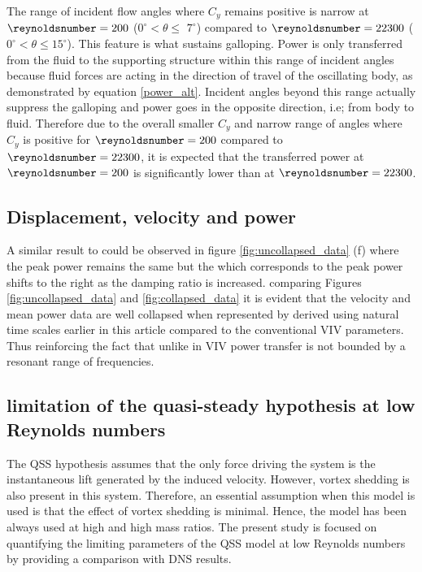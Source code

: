  The range of incident flow angles where $C_y$ remains positive is narrow at $\reynoldsnumber=200$ ($0^\circ <\theta \leq$ $7^\circ$) compared to $\reynoldsnumber=22300$ ($0^\circ <\theta \leq 15^\circ$). This feature is what sustains galloping. Power is only transferred from the fluid to the supporting structure within this range of incident angles because fluid forces are acting in the direction of travel of the oscillating body, as demonstrated by equation \ref{power_alt}. Incident angles beyond this range actually suppress the galloping and power goes in the opposite direction, i.e; from body to fluid. Therefore due to the overall smaller $C_y$ and narrow range of angles where $C_y$ is positive for $\reynoldsnumber=200$ compared to $\reynoldsnumber=22300$, it is expected that the transferred power at $\reynoldsnumber=200$ is significantly lower than at $\reynoldsnumber=22300$.
 

 
  
 
 \subsection{Displacement, velocity and power}
 
 A similar result to \cite{Barrero-Gil2010a} could be observed in figure \ref{fig:uncollapsed_data} (f)  where the peak power remains the same but the \ustar which corresponds to the peak power shifts to the right as the damping ratio is increased. comparing Figures \ref{fig:uncollapsed_data} and \ref{fig:collapsed_data} it is evident that the velocity and mean power data are well collapsed when represented by \massdamp derived using natural time scales earlier in this article compared to the conventional VIV parameters. Thus reinforcing the fact that unlike in VIV power transfer is not bounded by a resonant range of frequencies. 
 
 

\subsection{limitation of the quasi-steady hypothesis at low Reynolds numbers}

The QSS hypothesis assumes that the only force driving the system is the instantaneous lift generated by the induced velocity. However, vortex shedding is also present in this system. Therefore, an essential assumption when this model is used is that the effect of vortex shedding is minimal. Hence, the model has been always used at high \reynoldsnumber and high mass ratios. The present study is focused on quantifying the limiting parameters of the QSS model at low Reynolds numbers by providing a comparison with DNS results. 



